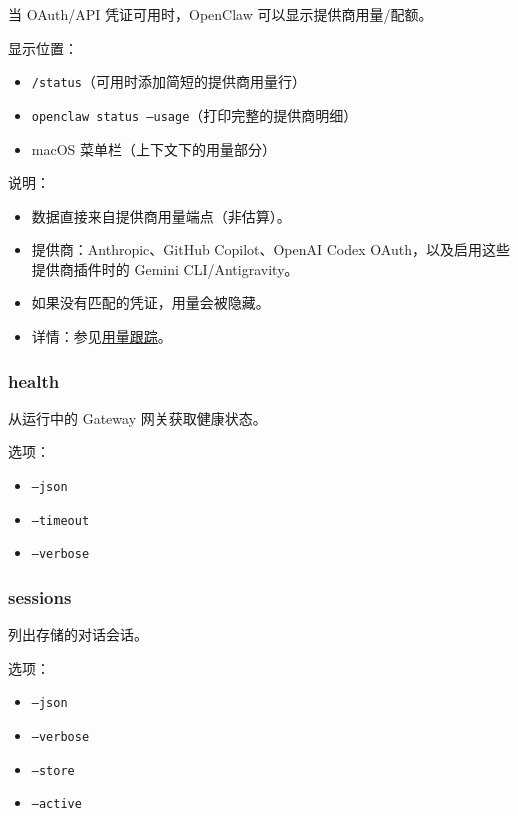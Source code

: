 当 OAuth/API 凭证可用时，OpenClaw 可以显示提供商用量/配额。

显示位置：

\begin{itemize}
  \item \texttt{/status}（可用时添加简短的提供商用量行）
  \item \texttt{openclaw status --usage}（打印完整的提供商明细）
  \item macOS 菜单栏（上下文下的用量部分）
\end{itemize}


说明：

\begin{itemize}
  \item 数据直接来自提供商用量端点（非估算）。
  \item 提供商：Anthropic、GitHub Copilot、OpenAI Codex OAuth，以及启用这些提供商插件时的 Gemini CLI/Antigravity。
  \item 如果没有匹配的凭证，用量会被隐藏。
  \item 详情：参见\href{/concepts/usage-tracking}{用量跟踪}。
\end{itemize}


\subsubsection{health}


从运行中的 Gateway 网关获取健康状态。

选项：

\begin{itemize}
  \item \texttt{--json}
  \item \texttt{--timeout }
  \item \texttt{--verbose}
\end{itemize}


\subsubsection{sessions}


列出存储的对话会话。

选项：

\begin{itemize}
  \item \texttt{--json}
  \item \texttt{--verbose}
  \item \texttt{--store }
  \item \texttt{--active }
\end{itemize}


